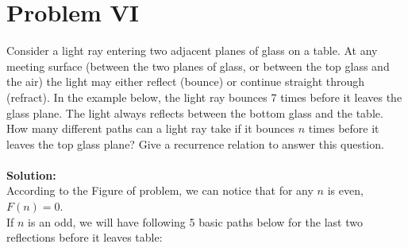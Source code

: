 \section{Problem VI}
Consider a light ray entering two adjacent planes of glass on a table. At any meeting surface (between the two planes of glass, or between the top glass and the air) the light may either reflect (bounce) or continue straight through (refract). In the example below, the light ray bounces 7 times before it leaves the glass plane. The light always reflects between the bottom glass and the table. How many different paths can a light ray take if it bounces $n$ times before it leaves the top glass plane? Give a recurrence relation to answer this question.\\\\
\textbf{Solution:} \\
According to the Figure of problem, we can notice that for any $n$ is even, $F(n) = 0$.\\
If $n$ is an odd, we will have following 5 basic paths below for the last two reflections before it leaves table:\\
